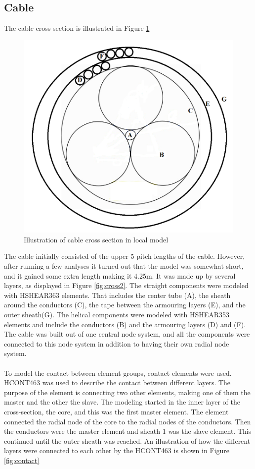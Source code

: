 \subsection{Cable}
The cable cross section is illustrated in Figure \ref{fig:crosspro}
\begin{figure}[H]
\centering
\includegraphics[scale=0.8]{figures/cross2}
\caption [$\; \:$ Cable cross section in local model]{Illustration of cable cross section in local model}
 \label{fig:crosspro}
\end{figure}
\noindent The cable initially consisted of the upper 5 pitch lengths of the cable. However, after running a few analyses it turned out that the model was somewhat short, and it gained some extra length making it 4.25m. It was made up by several layers, as displayed in Figure \ref{fig:cross2}.  The straight components were modeled with HSHEAR363 elements. That includes the center tube (A), the sheath around the conductors (C), the tape between the armouring layers (E), and the outer sheath(G). The helical components were modeled with HSHEAR353 elements and include the conductors (B) and the armouring layers (D) and (F). The cable was built out of one central node system, and all the components were connected to this node system in addition to having their own radial node system.\\\\ To model the contact between element groups, contact elements were used.  HCONT463 was used to describe the contact between different layers. The purpose of the element is connecting two other elements, making one of them the master and the other the slave. The modeling started in the inner layer of the cross-section, the core, and this was the first master element. The element connected the radial node of the core to the radial nodes of the conductors. Then the conductors were the master element and sheath 1 was the slave element. This continued until the outer sheath was reached. An illustration of how the different layers were connected to each other by the HCONT463 is shown in Figure \ref{fig:contact}

